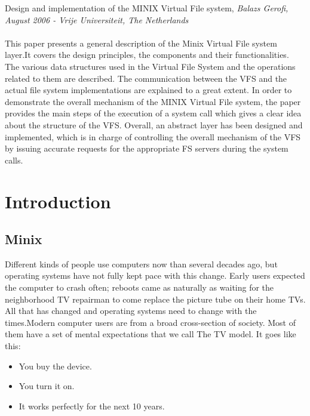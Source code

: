 
\vspace{10mm}
 Design and implementation of the MINIX Virtual File system, { \em Balazs Gerofi, August 2006 - Vrije Universiteit, The Netherlands
}\cite{vfs}
\\
\\
This paper presents a general description of the Minix Virtual File system layer.It covers the design principles, the components and their functionalities.
The various data structures used in the Virtual File System and the operations related to them are described. The communication between the VFS and the actual file system implementations are explained to a great extent.
In order to demonstrate the overall mechanism of the MINIX Virtual File system, the paper provides the main steps of the execution of a system call which gives a clear idea about the structure of the VFS.
Overall, an abstract layer has been designed and implemented, which is in charge of controlling the overall mechanism of the VFS by issuing accurate requests for the appropriate FS servers during the system calls.

\chapter{Introduction}

\section{Minix \cite{vfs} }

Different kinds of people use computers now than sev­eral decades ago, but operating systems have not fully kept pace with this change. Early users expected the computer to crash often; reboots came as naturally as waiting for the neighborhood TV re­pairman to come replace the picture tube on their home TVs. All that has changed and operating systems need to change with the times.Modern computer users are from a broad cross-section of society. Most of them have a set of mental expectations that we call The TV model.
It goes like this:
\begin{itemize}
\item You buy the device.
\item You turn it on.
\item It works perfectly for the next 10 years.
\end{itemize}

